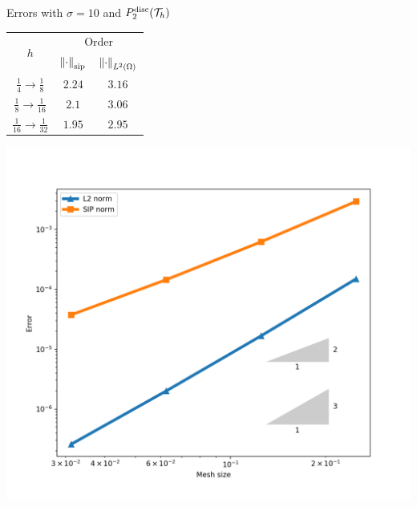		
		\begin{frame}{Errors with $\sigma=10$ and $\relax{P}^{\text{disc}}_2(\mathcal{T}_h)$}
		\begin{minipage}{0.49\textwidth}
			\centering
			\begin{tabular}{|c|c|c|}
				\hline 
				\multirow{2}{*}{$h$} & \multicolumn{2}{c|}{Order} \\
				\cline{2-3}
				&  $\left\|\cdot\right\|_{\text{sip}}$ & $\left\|\cdot\right\|_{L^2(\Omega)}$ \\ 
				\hline
				\hline
				$\frac{1}{4}\to\frac{1}{8}$ & $2.24$ & $3.16$ \\ 
				\hline 
				$\frac{1}{8}\to\frac{1}{16}$ & $2.1$ & $3.06$ \\ 
				\hline 
				$\frac{1}{16}\to\frac{1}{32}$ & $1.95$ & $2.95$\\
				\hline
			\end{tabular}
		\end{minipage}
		\begin{minipage}{0.5\textwidth}
			\centering
			\includegraphics[scale=0.30]{img/Difusion/errores_difusion_P2dc.png}
		\end{minipage}
		\end{frame}
		
